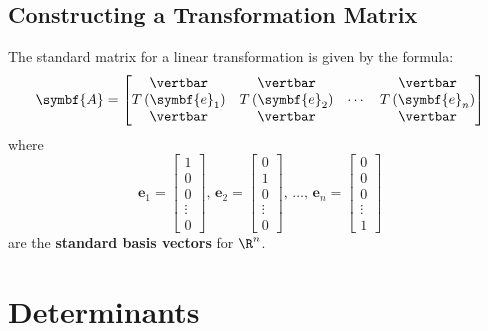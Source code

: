 \documentclass{article}
\begin{document}
\subsection{Constructing a Transformation Matrix}
\begin{theorem}
    The standard matrix for a linear transformation is given by the
    formula:
    \begin{equation*}
        \symbf{A} =
        \begin{bmatrix}
            \vertbar                  & \vertbar                  &        & \vertbar                  \\
            T\left(\symbf{e}_1\right) & T\left(\symbf{e}_2\right) & \cdots & T\left(\symbf{e}_n\right) \\
            \vertbar                  & \vertbar                  &        & \vertbar
        \end{bmatrix}
    \end{equation*}
    where
    \begin{equation*}
        \symbf{e}_1 =
        \begin{bmatrix}
            1      \\
            0      \\
            0      \\
            \vdots \\
            0
        \end{bmatrix}
        ,\, \symbf{e}_2 =
        \begin{bmatrix}
            0      \\
            1      \\
            0      \\
            \vdots \\
            0
        \end{bmatrix}
        ,\, \dots,\, \symbf{e}_n =
        \begin{bmatrix}
            0      \\
            0      \\
            0      \\
            \vdots \\
            1
        \end{bmatrix}
    \end{equation*}
    are the \textbf{standard basis vectors} for \(\R^n\).
\end{theorem}
\section{Determinants}
\end{document}
